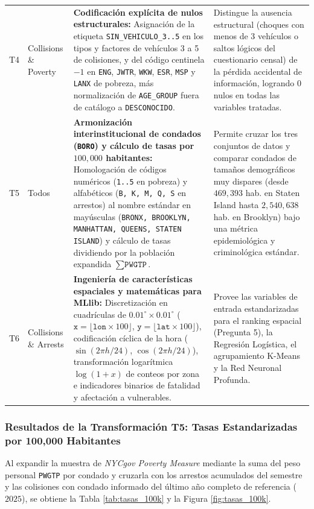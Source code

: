\begin{table}[H]
\begin{tabularx}{\linewidth}{c l >{\raggedright\arraybackslash}p{4.3cm} X}
T4 & Collisions \& Poverty & \textbf{Codificación explícita de nulos estructurales:} Asignación de la etiqueta \texttt{SIN\_VEHICULO\_3..5} en los tipos y factores de vehículos 3 a 5 de colisiones, y del código centinela $-1$ en \texttt{ENG}, \texttt{JWTR}, \texttt{WKW}, \texttt{ESR}, \texttt{MSP} y \texttt{LANX} de pobreza, más normalización de \texttt{AGE\_GROUP} fuera de catálogo a \texttt{DESCONOCIDO}. & Distingue la ausencia estructural (choques con menos de 3 vehículos o saltos lógicos del cuestionario censal) de la pérdida accidental de información, logrando $0$ nulos en todas las variables tratadas. \\
T5 & Todos & \textbf{Armonización interinstitucional de condados (\texttt{BORO}) y cálculo de tasas por $100,000$ habitantes:} Homologación de códigos numéricos (\texttt{1..5} en pobreza) y alfabéticos (\texttt{B, K, M, Q, S} en arrestos) al nombre estándar en mayúsculas (\texttt{BRONX, BROOKLYN, MANHATTAN, QUEENS, STATEN ISLAND}) y cálculo de tasas dividiendo por la población expandida $\sum \texttt{PWGTP}$. & Permite cruzar los tres conjuntos de datos y comparar condados de tamaños demográficos muy dispares (desde $469,393$ hab. en Staten Island hasta $2,540,638$ hab. en Brooklyn) bajo una métrica epidemiológica y criminológica estándar. \\
T6 & Collisions \& Arrests & \textbf{Ingeniería de características espaciales y matemáticas para MLlib:} Discretización en cuadrículas de $0.01^\circ \times 0.01^\circ$ ($\texttt{x} = \lfloor \texttt{lon}\times 100\rfloor$, $\texttt{y} = \lfloor \texttt{lat}\times 100\rfloor$), codificación cíclica de la hora ($\sin(2\pi h/24)$, $\cos(2\pi h/24)$), transformación logarítmica $\log(1+x)$ de conteos por zona e indicadores binarios de fatalidad y afectación a vulnerables. & Provee las variables de entrada estandarizadas para el ranking espacial (Pregunta 5), la Regresión Logística, el agrupamiento K-Means y la Red Neuronal Profunda. \\
\bottomrule
\end{tabularx}
\end{table}

\subsubsection{Resultados de la Transformación T5: Tasas Estandarizadas por 100,000 Habitantes}

Al expandir la muestra de \textit{NYCgov Poverty Measure} mediante la suma del peso personal \texttt{PWGTP} por condado y cruzarla con los arrestos acumulados del semestre y las colisiones con condado informado del último año completo de referencia ($2025$), se obtiene la Tabla \ref{tab:tasas_100k} y la Figura \ref{fig:tasas_100k}.

